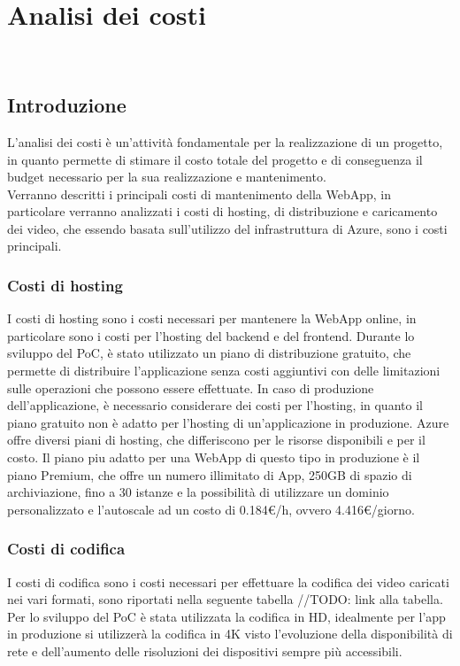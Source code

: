 \chapter{Analisi dei costi}
\label{cap:analisi-costi}
\\

\section{Introduzione}
\label{sec:introduzione}
L'analisi dei costi è un'attività fondamentale per la realizzazione di un progetto, in quanto permette di stimare il costo totale del progetto e di conseguenza il budget necessario per la sua realizzazione e mantenimento.\\
Verranno descritti i principali costi di mantenimento della WebApp, in particolare verranno analizzati i costi di hosting, di distribuzione e caricamento dei video, che essendo basata sull'utilizzo del infrastruttura di Azure, sono i costi principali.\\

\subsection{Costi di hosting}
\label{subsec:costi-hosting}
I costi di hosting sono i costi necessari per mantenere la WebApp online, in particolare sono i costi per l'hosting del backend e del frontend. Durante lo sviluppo del PoC, è stato utilizzato un piano di distribuzione gratuito, che permette di distribuire l'applicazione senza costi aggiuntivi con delle limitazioni sulle operazioni che possono essere effettuate. In caso di produzione dell'applicazione, è necessario considerare dei costi per l'hosting, in quanto il piano gratuito non è adatto per l'hosting di un'applicazione in produzione. Azure offre diversi piani di hosting, che differiscono per le risorse disponibili e per il costo. Il piano piu adatto per una WebApp di questo tipo in produzione è il piano Premium, che offre un numero illimitato di App, 250GB di spazio di archiviazione, fino a 30 istanze e la possibilità di utilizzare un dominio personalizzato e l'autoscale ad un costo di 0.184€/h, ovvero 4.416€/giorno.\\
\subsection{Costi di codifica}
I costi di codifica sono i costi necessari per effettuare la codifica dei video caricati nei vari formati, sono riportati nella seguente tabella //TODO: link alla tabella.
Per lo sviluppo del PoC è stata utilizzata la codifica in HD, idealmente per l'app in produzione si utilizzerà la codifica in 4K visto l'evoluzione della disponibilità di rete e dell'aumento delle risoluzioni dei dispositivi sempre più accessibili.

